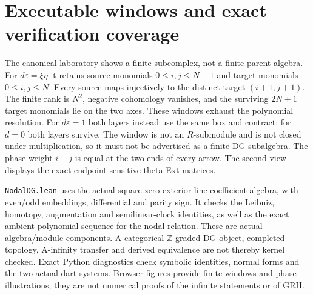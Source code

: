 \section{Executable windows and exact verification coverage}
The canonical laboratory shows a finite subcomplex, not a finite parent
algebra. For $d\varepsilon=\xi\eta$ it retains source monomials
$0\le i,j\le N-1$ and target monomials $0\le i,j\le N$.
Every source maps injectively to the distinct target $(i+1,j+1)$.
The finite rank is $N^2$, negative cohomology vanishes, and the surviving
$2N+1$ target monomials lie on the two axes. These windows exhaust the
polynomial resolution. For $d\varepsilon=1$ both layers instead use the
same box and contract; for $d=0$ both layers survive. The window is not an $R$-submodule and is not
closed under multiplication, so it must not be advertised as a finite DG
subalgebra. The phase weight $i-j$ is equal at the two ends of every arrow.
The second view displays the exact endpoint-sensitive theta Ext matrices.

\texttt{NodalDG.lean} uses the actual square-zero exterior-line coefficient
algebra, with even/odd embeddings, differential and parity sign. It checks
the Leibniz, homotopy, augmentation and semilinear-clock identities, as well
as the exact ambient polynomial sequence for the nodal relation. These are
actual algebra/module components. A categorical $\mathbb Z$-graded DG object,
completed topology, A-infinity transfer and derived equivalence are not
thereby kernel checked. Exact Python diagnostics check symbolic identities,
normal forms and the two actual dart systems. Browser figures provide finite
windows and phase illustrations; they are not numerical proofs of the
infinite statements or of GRH.
